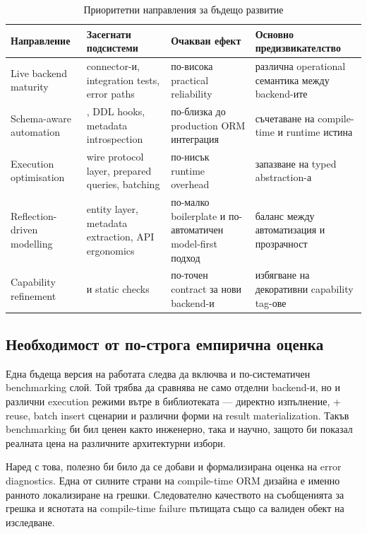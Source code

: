 \begin{table}[H]
\centering
\small
\caption{Приоритетни направления за бъдещо развитие}
\label{tab:future_work_priorities}
\begin{tabularx}{\textwidth}{L{3.0cm}L{3.2cm}L{3.1cm}Y}
\toprule
\textbf{Направление} & \textbf{Засегнати подсистеми} & \textbf{Очакван ефект} & \textbf{Основно предизвикателство} \\
\midrule
Live backend maturity & connector-и, integration tests, error paths & по-висока practical reliability & различна operational семантика между backend-ите \\
Schema-aware automation & , DDL hooks, metadata introspection & по-близка до production ORM интеграция & съчетаване на compile-time и runtime истина \\
Execution optimisation & wire protocol layer, prepared queries, batching & по-нисък runtime overhead & запазване на typed abstraction-а \\
Reflection-driven modelling & entity layer, metadata extraction, API ergonomics & по-малко boilerplate и по-автоматичен model-first подход & баланс между автоматизация и прозрачност \\
Capability refinement &  и static checks & по-точен contract за нови backend-и & избягване на декоративни capability tag-ове \\
\bottomrule
\end{tabularx}
\end{table}

\subsection{Необходимост от по-строга емпирична оценка}

Една бъдеща версия на работата следва да включва и по-систематичен benchmarking слой. Той трябва да сравнява не само отделни backend-и, но и различни execution режими вътре в библиотеката --- директно изпълнение,  + reuse, batch insert сценарии и различни форми на result materialization. Такъв benchmarking би бил ценен както инженерно, така и научно, защото би показал реалната цена на различните архитектурни избори.

Наред с това, полезно би било да се добави и формализирана оценка на error diagnostics. Една от силните страни на compile-time ORM дизайна е именно ранното локализиране на грешки. Следователно качеството на съобщенията за грешка и яснотата на compile-time failure пътищата също са валиден обект на изследване.

